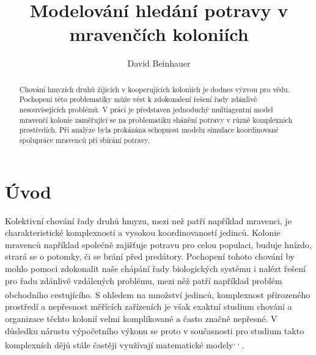 \documentclass[10pt,a4paper,twocolumn]{article}
\begin{document}
\providecommand{\ShortAuthorList}[0]{David Beinhauer}
\title{Modelování hledání potravy v mravenčích koloniích}
\author[1,*]{David Beinhauer}

\date{\dateline{}}

\begin{abstract}
\noindent
Chování hmyzích druhů žijících v kooperujících koloniích je dodnes 
výzvou pro vědu. Pochopení této problematiky může vést k zdokonalení řešení
řady zdánlivě nesouvisejících problémů. V práci je představen jednoduchý
multiagentní model mravenčí kolonie zaměřující se na problematiku shánění
potravy v různě komplexních prostředích. 
Při analýze byla prokázána schopnost modelu simulace koordinované 
spolupráce mravenců při sbírání potravy.


\DOI{} %
\end{abstract}

\maketitle
\thispagestyle{titlestyle}



\section{Úvod}

Kolektivní chování řady druhů hmyzu, mezi než patří například mravenci,
je charakteristické komplexností a vysokou koordinovaností jedinců. Kolonie
mravenců například společně zajišťuje potravu pro celou populaci, buduje hnízdo,
strará se o potomky, či se brání před predátory. Pochopení tohoto chování by
mohlo pomoci zdokonalit naše chápání řady biologických systému i nalézt
řešení pro řadu zdánlivě vzdálených problému, mezi něž
patří například problém obchodního 
cestujícího\textsuperscript{\cite{applegate2011traveling}}. 
S ohledem na množství jedinců, komplexnost přirozeného prostředí a 
nepřesnost měřících zařízeních je však exaktní studium chování a 
organizace těchto kolonií velmi komplikované a 
často značně nepřesné. V důsledku nárustu výpočetního výkonu se proto v 
současnosti pro studium takto komplexních dějů stále častěji 
využívají matematické modely\textsuperscript{\cite{drogoul1994multi}, 
\cite{xiang2008ant}, \cite{ilie2013multi}}. 
\end{document}

